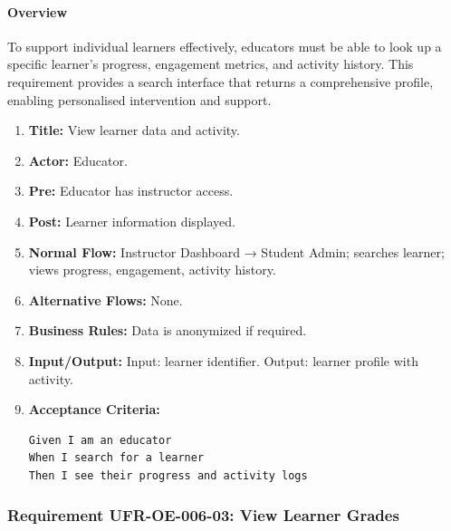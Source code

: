 \paragraph{Overview}
To support individual learners effectively, educators must be able to look up a specific learner’s progress, engagement metrics, and activity history. This requirement provides a search interface that returns a comprehensive profile, enabling personalised intervention and support.
\begin{enumerate}[label=\textbf{\arabic*.}]
\item \textbf{Title:} View learner data and activity.
\item \textbf{Actor:} Educator.
\item \textbf{Pre:} Educator has instructor access.
\item \textbf{Post:} Learner information displayed.
\item \textbf{Normal Flow:} Instructor Dashboard → Student Admin; searches learner; views progress, engagement, activity history.
\item \textbf{Alternative Flows:} None.
\item \textbf{Business Rules:} Data is anonymized if required.
\item \textbf{Input/Output:} Input: learner identifier. Output: learner profile with activity.
\item \textbf{Acceptance Criteria:}
    \begin{verbatim}
Given I am an educator
When I search for a learner
Then I see their progress and activity logs
    \end{verbatim}
\end{enumerate}

\subsubsection{Requirement UFR-OE-006-03: View Learner Grades}
